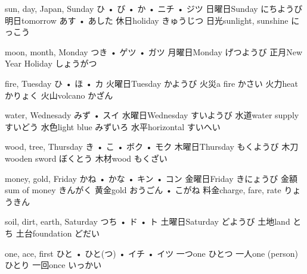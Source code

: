 



\setcounter{cardnum}{1}

		{sun, day, Japan, Sunday}
		{ひ • び • か • ニチ • ジツ}
		{日曜日}{Sunday にちようび}
		{明日}{tomorrow あす • あした}
		{休日}{holiday きゅうじつ}
		{日光}{sunlight, sunshine にっこう}
		{}{}

		{moon, month, Monday}
		{つき • ゲツ • ガツ}
		{月曜日}{Monday げつようび}
		{正月}{New Year Holiday しょうがつ}
		{}{}
		{}{}
		{}{}

		{fire, Tuesday}
		{ひ • ほ • カ}
		{火曜日}{Tuesday かようび}
		{火災}{a fire かさい}
		{火力}{heat かりょく}
		{火山}{volcano かざん}
		{}{}

		{water, Wednesady}
		{みず • スイ}
		{水曜日}{Wednesday すいようび}
		{水道}{water supply すいどう}
		{水色}{light blue みずいろ}
		{水平}{horizontal すいへい}
		{}{}

		{wood, tree, Thursday}
		{き • こ • ボク • モク}
		{木曜日}{Thursday もくようび}
		{木刀}{wooden sword ぼくとう}
		{木材}{wood もくざい}
		{}{}
		{}{}

		{money, gold, Friday}
		{かね • かな • キン • コン}
		{金曜日}{Friday きにょうび}
		{金額}{sum of money きんがく}
		{黄金}{gold おうごん • こがね}
		{料金}{charge, fare, rate りょうきん}
		{}{}

		{soil, dirt, earth, Saturday}
		{つち • ド • ト}
		{土曜日}{Saturday どようび}
		{土地}{land とち}
		{土台}{foundation どだい}
		{}{}
		{}{}

		{one, ace, first}
		{ひと • ひと(つ) • イチ • イツ}
		{一つ}{one ひとつ}
		{一人}{one (person) ひとり}
		{一回}{once いっかい}
		{}{}
		{}{}

